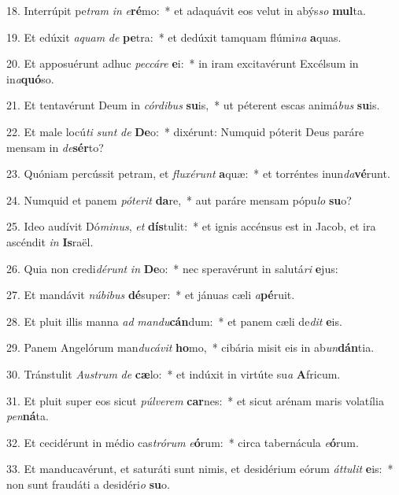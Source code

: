18. Interrúpit pe\textit{tram} \textit{in} \textit{e}\textbf{ré}mo:~*  et adaquávit eos velut in abýs\textit{so} \textbf{mul}ta.\

19. Et edúxit \textit{a}\textit{quam} \textit{de} \textbf{pe}tra:~*  et dedúxit tamquam flúmi\textit{na} \textbf{a}quas.\

20. Et apposuérunt adhuc \textit{pec}\textit{cá}\textit{re} \textbf{e}i:~*  in iram excitavérunt Excélsum in in\textit{a}\textbf{quó}so.\

21. Et tentavérunt Deum in \textit{cór}\textit{di}\textit{bus} \textbf{su}is,~*  ut péterent escas animá\textit{bus} \textbf{su}is.\

22. Et male locú\textit{ti} \textit{sunt} \textit{de} \textbf{De}o:~*  dixérunt: Numquid póterit Deus paráre mensam in \textit{de}\textbf{sér}to?\

23. Quóniam percússit petram, et \textit{flu}\textit{xé}\textit{runt} \textbf{a}quæ:~*  et torréntes inun\textit{da}\textbf{vé}runt.\

24. Numquid et panem \textit{pót}\textit{e}\textit{rit} \textbf{da}re,~*  aut paráre mensam pópu\textit{lo} \textbf{su}o?\

25. Ideo audívit Dó\textit{mi}\textit{nus}, \textit{et} \textbf{dís}tulit:~*  et ignis accénsus est in Jacob, et ira ascéndit \textit{in} \textbf{Is}raël.\

26. Quia non credi\textit{dé}\textit{runt} \textit{in} \textbf{De}o:~*  nec speravérunt in salutá\textit{ri} \textbf{e}jus:\

27. Et mandávit \textit{nú}\textit{bi}\textit{bus} \textbf{dé}super:~*  et jánuas cæli \textit{a}\textbf{pé}ruit.\

28. Et pluit illis manna \textit{ad} \textit{man}\textit{du}\textbf{cán}dum:~*  et panem cæli de\textit{dit} \textbf{e}is.\

29. Panem Angelórum man\textit{du}\textit{cá}\textit{vit} \textbf{ho}mo,~*  cibária misit eis in ab\textit{un}\textbf{dán}tia.\

30. Tránstulit \textit{Aus}\textit{trum} \textit{de} \textbf{cæ}lo:~*  et indúxit in virtúte su\textit{a} \textbf{A}fricum.\

31. Et pluit super eos sicut \textit{púl}\textit{ve}\textit{rem} \textbf{car}nes:~*  et sicut arénam maris volatília \textit{pen}\textbf{ná}ta.\

32. Et cecidérunt in médio cas\textit{tró}\textit{rum} \textit{e}\textbf{ó}rum:~*  circa tabernácula \textit{e}\textbf{ó}rum.\

33. Et manducavérunt, et saturáti sunt nimis, et desidérium eórum \textit{át}\textit{tu}\textit{lit} \textbf{e}is:~*  non sunt fraudáti a desidéri\textit{o} \textbf{su}o.\

